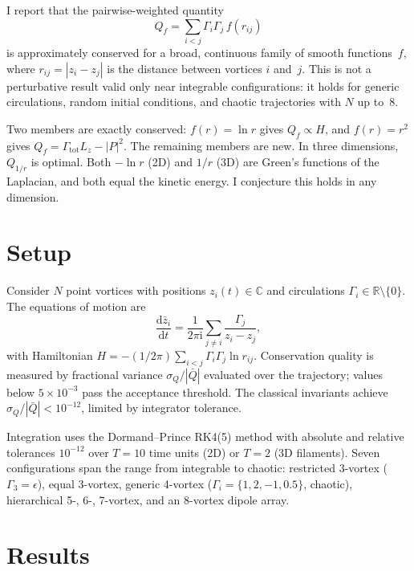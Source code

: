 \documentclass[rapids]{jfm}
\begin{document}
I report that the pairwise-weighted quantity
\begin{equation}
Q_f = \sum_{i<j} \Gamma_i \Gamma_j \, f(r_{ij})
\label{eq:qf}
\end{equation}
is approximately conserved for a broad, continuous family of smooth functions~$f$, where $r_{ij} = |z_i - z_j|$ is the distance between vortices $i$ and~$j$. This is not a perturbative result valid only near integrable configurations: it holds for generic circulations, random initial conditions, and chaotic trajectories with $N$ up to~8.

Two members are exactly conserved: $f(r) = \ln r$ gives $Q_f \propto H$, and $f(r) = r^2$ gives $Q_f = \Gamma_\mathrm{tot} L_z - |P|^2$. The remaining members are new. In three dimensions, $Q_{1/r}$ is optimal. Both $-\ln r$ (2D) and $1/r$ (3D) are Green's functions of the Laplacian, and both equal the kinetic energy. I conjecture this holds in any dimension.

\section{Setup}

Consider $N$ point vortices with positions $z_i(t) \in \mathbb{C}$ and circulations $\Gamma_i \in \mathbb{R} \setminus \{0\}$. The equations of motion are
\begin{equation}
\frac{\mathrm{d}\bar{z}_i}{\mathrm{d}t} = \frac{1}{2\pi \mathrm{i}} \sum_{j \neq i} \frac{\Gamma_j}{z_i - z_j},
\end{equation}
with Hamiltonian $H = -(1/2\pi) \sum_{i<j} \Gamma_i \Gamma_j \ln r_{ij}$. Conservation quality is measured by fractional variance $\sigma_Q / |\bar{Q}|$ evaluated over the trajectory; values below $5 \times 10^{-3}$ pass the acceptance threshold. The classical invariants achieve $\sigma_Q / |\bar{Q}| < 10^{-12}$, limited by integrator tolerance.

Integration uses the Dormand--Prince RK4(5) method \citep{dormand1980} with absolute and relative tolerances $10^{-12}$ over $T = 10$ time units (2D) or $T = 2$ (3D filaments). Seven configurations span the range from integrable to chaotic: restricted 3-vortex ($\Gamma_3 = \epsilon$), equal 3-vortex, generic 4-vortex ($\Gamma_i = \{1, 2, -1, 0.5\}$, chaotic), hierarchical 5-, 6-, 7-vortex, and an 8-vortex dipole array.

\section{Results}
\end{document}
